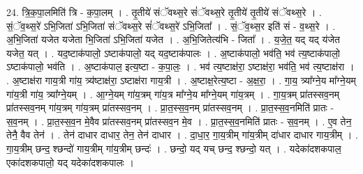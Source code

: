 \documentclass[17pt]{extarticle}
\begin{document}
24. त्रि॒क॒पा॒लमिति॑ त्रि - क॒पा॒लम् । . तृ॒तीये॑ संॅवथ्स॒रे सं॑ॅवथ्स॒रे तृ॒तीये॑ तृ॒तीये॑ संॅवथ्स॒रे । . सं॒ॅव॒थ्स॒रे॑ ऽभि॒जिता॑ ऽभि॒जिता॑ संॅवथ्स॒रे सं॑ॅवथ्स॒रे॑ ऽभि॒जिता᳚ । . सं॒ॅव॒थ्स॒र इति॑ सं - व॒थ्स॒रे । . अ॒भि॒जिता॑ यजेत यजेता भि॒जिता॑ ऽभि॒जिता॑ यजेत । . अ॒भि॒जितेत्य॑भि - जिता᳚ । . य॒जे॒त॒ यद् यद् य॑जेत यजेत॒ यत् । . यद॒ष्टाक॑पालो॒ ऽष्टाक॑पालो॒ यद् यद॒ष्टाक॑पालः । . अ॒ष्टाक॑पालो॒ भव॑ति॒ भव॑ त्य॒ष्टाक॑पालो॒ ऽष्टाक॑पालो॒ भव॑ति । . अ॒ष्टाक॑पाल॒ इत्य॒ष्टा - क॒पा॒लः॒ । . भव॑ त्य॒ष्टाक्ष॑रा॒ ऽष्टाक्ष॑रा॒ भव॑ति॒ भव॑ त्य॒ष्टाक्ष॑रा । . अ॒ष्टाक्ष॑रा गाय॒त्री गा॑य॒ त्र्य॑ष्टाक्ष॑रा॒ ऽष्टाक्ष॑रा गाय॒त्री । . अ॒ष्टाक्ष॒रेत्य॒ष्टा - अ॒क्ष॒रा॒ । . गा॒य॒ त्र्या᳚ग्ने॒य मा᳚ग्ने॒यम् गा॑य॒त्री गा॑य॒ त्र्या᳚ग्ने॒यम् । . आ॒ग्ने॒यम् गा॑य॒त्रम् गा॑य॒त्र मा᳚ग्ने॒य मा᳚ग्ने॒यम् गा॑य॒त्रम् । . गा॒य॒त्रम् प्रा॑तस्सव॒नम् प्रा॑तस्सव॒नम् गा॑य॒त्रम् गा॑य॒त्रम् प्रा॑तस्सव॒नम् । . प्रा॒त॒स्स॒व॒नम् प्रा॑तस्सव॒नम् । . प्रा॒त॒स्स॒व॒नमिति॑ प्रातः - स॒व॒नम् । . प्रा॒त॒स्स॒व॒न मे॒वैव प्रा॑तस्सव॒नम् प्रा॑तस्सव॒न मे॒व । . प्रा॒त॒स्स॒व॒नमिति॑ प्रातः - स॒व॒नम् । . ए॒व तेन॒ तेनै॒ वैव तेन॑ । . तेन॑ दाधार दाधार॒ तेन॒ तेन॑ दाधार । . दा॒धा॒र॒ गा॒य॒त्रीम् गा॑य॒त्रीम् दा॑धार दाधार गाय॒त्रीम् । . गा॒य॒त्रीम् छन्द॒ श्छन्दो॑ गाय॒त्रीम् गा॑य॒त्रीम् छन्दः॑ । . छन्दो॒ यद् यच् छन्द॒ श्छन्दो॒ यत् । . यदेका॑दशकपाल॒ एका॑दशकपालो॒ यद् यदेका॑दशकपालः । \newline
\end{document}

